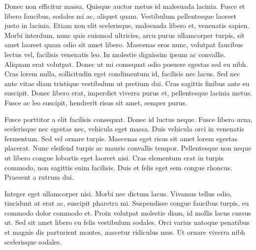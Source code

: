 Donec non efficitur massa. Quisque auctor metus id malesuada lacinia. Fusce et libero faucibus, sodales mi ac, aliquet quam. Vestibulum pellentesque laoreet justo in lacinia. Etiam non elit scelerisque, malesuada libero et, venenatis sapien. Morbi interdum, nunc quis euismod ultricies, arcu purus ullamcorper turpis, sit amet laoreet quam odio sit amet libero. Maecenas eros nunc, volutpat faucibus lectus vel, facilisis venenatis leo. In molestie dignissim ipsum ac convallis. Aliquam erat volutpat. Donec ut mi consequat odio posuere egestas sed eu nibh. Cras lorem nulla, sollicitudin eget condimentum id, facilisis nec lacus. Sed nec ante vitae diam tristique vestibulum ut pretium dui. Cras sagittis finibus ante eu suscipit. Donec libero erat, imperdiet viverra purus et, pellentesque lacinia metus. Fusce ac leo suscipit, hendrerit risus sit amet, semper purus.

Fusce porttitor a elit facilisis consequat. Donec id luctus neque. Fusce libero urna, scelerisque nec egestas nec, vehicula eget massa. Duis vehicula orci in venenatis fermentum. Sed vel ornare turpis. Maecenas eget risus sit amet lorem egestas placerat. Nunc eleifend turpis ac mauris convallis tempor. Pellentesque non neque ut libero congue lobortis eget laoreet nisi. Cras elementum erat in turpis commodo, non sagittis enim facilisis. Duis et felis eget sem congue rhoncus. Praesent a rutrum dui.

Integer eget ullamcorper nisi. Morbi nec dictum lacus. Vivamus tellus odio, tincidunt at erat ac, suscipit pharetra mi. Suspendisse congue faucibus turpis, eu commodo dolor commodo et. Proin volutpat molestie diam, id mollis lacus cursus ut. Sed sit amet libero eu felis vestibulum sodales. Orci varius natoque penatibus et magnis dis parturient montes, nascetur ridiculus mus. Ut ornare viverra nibh scelerisque sodales.